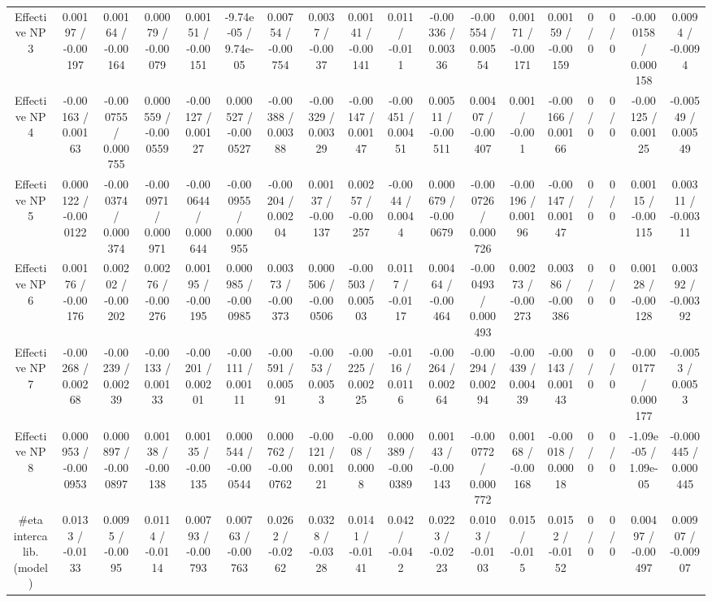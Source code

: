 \documentclass[10pt]{article}
\begin{document}
\begin{table}[htbp]
\begin{center}
\begin{tabular}{|c|c|c|c|c|c|c|c|c|c|c|c|c|c|c|c|c|c|}
  Effective NP 3 & 0.00197 / -0.00197 & 0.00164 / -0.00164 & 0.00079 / -0.00079 & 0.00151 / -0.00151 & -9.74e-05 / 9.74e-05 & 0.00754 / -0.00754 & 0.0037 / -0.0037 & 0.00141 / -0.00141 & 0.011 / -0.011 & -0.00336 / 0.00336 & -0.00554 / 0.00554 & 0.00171 / -0.00171 & 0.00159 / -0.00159 & 0 / 0 & 0 / 0 & -0.000158 / 0.000158 & 0.0094 / -0.0094 \\ 
  Effective NP 4 & -0.00163 / 0.00163 & -0.000755 / 0.000755 & 0.000559 / -0.000559 & -0.00127 / 0.00127 & 0.000527 / -0.000527 & -0.00388 / 0.00388 & -0.00329 / 0.00329 & -0.00147 / 0.00147 & -0.00451 / 0.00451 & 0.00511 / -0.00511 & 0.00407 / -0.00407 & 0.001 / -0.001 & -0.00166 / 0.00166 & 0 / 0 & 0 / 0 & -0.00125 / 0.00125 & -0.00549 / 0.00549 \\ 
  Effective NP 5 & 0.000122 / -0.000122 & -0.000374 / 0.000374 & -0.000971 / 0.000971 & -0.000644 / 0.000644 & -0.000955 / 0.000955 & -0.00204 / 0.00204 & 0.00137 / -0.00137 & 0.00257 / -0.00257 & -0.0044 / 0.0044 & 0.000679 / -0.000679 & -0.000726 / 0.000726 & -0.00196 / 0.00196 & -0.00147 / 0.00147 & 0 / 0 & 0 / 0 & 0.00115 / -0.00115 & 0.00311 / -0.00311 \\ 
  Effective NP 6 & 0.00176 / -0.00176 & 0.00202 / -0.00202 & 0.00276 / -0.00276 & 0.00195 / -0.00195 & 0.000985 / -0.000985 & 0.00373 / -0.00373 & 0.000506 / -0.000506 & -0.00503 / 0.00503 & 0.0117 / -0.0117 & 0.00464 / -0.00464 & -0.000493 / 0.000493 & 0.00273 / -0.00273 & 0.00386 / -0.00386 & 0 / 0 & 0 / 0 & 0.00128 / -0.00128 & 0.00392 / -0.00392 \\ 
  Effective NP 7 & -0.00268 / 0.00268 & -0.00239 / 0.00239 & -0.00133 / 0.00133 & -0.00201 / 0.00201 & -0.00111 / 0.00111 & -0.00591 / 0.00591 & -0.0053 / 0.0053 & -0.00225 / 0.00225 & -0.0116 / 0.0116 & -0.00264 / 0.00264 & -0.00294 / 0.00294 & -0.00439 / 0.00439 & -0.00143 / 0.00143 & 0 / 0 & 0 / 0 & -0.000177 / 0.000177 & -0.0053 / 0.0053 \\ 
  Effective NP 8 & 0.000953 / -0.000953 & 0.000897 / -0.000897 & 0.00138 / -0.00138 & 0.00135 / -0.00135 & 0.000544 / -0.000544 & 0.000762 / -0.000762 & -0.00121 / 0.00121 & -0.0008 / 0.0008 & 0.000389 / -0.000389 & 0.00143 / -0.00143 & -0.000772 / 0.000772 & 0.00168 / -0.00168 & -0.00018 / 0.00018 & 0 / 0 & 0 / 0 & -1.09e-05 / 1.09e-05 & -0.000445 / 0.000445 \\ 
  #eta intercalib. (model) & 0.0133 / -0.0133 & 0.0095 / -0.0095 & 0.0114 / -0.0114 & 0.00793 / -0.00793 & 0.00763 / -0.00763 & 0.0262 / -0.0262 & 0.0328 / -0.0328 & 0.0141 / -0.0141 & 0.042 / -0.042 & 0.0223 / -0.0223 & 0.0103 / -0.0103 & 0.015 / -0.015 & 0.0152 / -0.0152 & 0 / 0 & 0 / 0 & 0.00497 / -0.00497 & 0.00907 / -0.00907 \\ 

\end{tabular}
\end{center}
\end{table}
\end{document}
